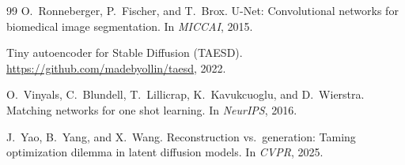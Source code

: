 \documentclass[11pt]{article}
\begin{document}
\begin{thebibliography}{99}
 O.~Ronneberger, P.~Fischer, and T.~Brox. U-Net: Convolutional networks for biomedical image segmentation. In \emph{MICCAI}, 2015.

 Tiny autoencoder for Stable Diffusion (TAESD). \url{https://github.com/madebyollin/taesd}, 2022.

 O.~Vinyals, C.~Blundell, T.~Lillicrap, K.~Kavukcuoglu, and D.~Wierstra. Matching networks for one shot learning. In \emph{NeurIPS}, 2016.

 J.~Yao, B.~Yang, and X.~Wang. Reconstruction vs.\ generation: Taming optimization dilemma in latent diffusion models. In \emph{CVPR}, 2025.

\end{thebibliography}
\end{document}
